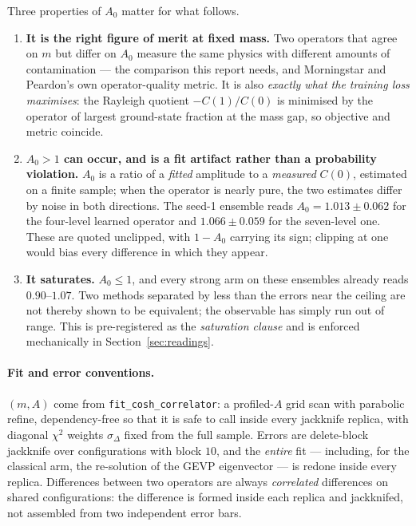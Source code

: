 \documentclass[11pt,a4paper]{article}
\newcommand{\Azero}{A_0}
\begin{document}
Three properties of $\Azero$ matter for what follows.

\begin{enumerate}
  \item \textbf{It is the right figure of merit at fixed mass.} Two operators
        that agree on $m$ but differ on $\Azero$ measure the same physics with
        different amounts of contamination --- the comparison this report needs,
        and Morningstar and Peardon's own operator-quality metric. It is also
        \emph{exactly what the training loss maximises}: the Rayleigh quotient
        $-C(1)/C(0)$ is minimised by the operator of largest ground-state
        fraction at the mass gap, so objective and metric coincide.
  \item \textbf{$\Azero > 1$ can occur, and is a fit artifact rather than a
        probability violation.} $\Azero$ is a ratio of a \emph{fitted} amplitude
        to a \emph{measured} $C(0)$, estimated on a finite sample; when the
        operator is nearly pure, the two estimates differ by noise in both
        directions. The seed-1 ensemble reads $\Azero = 1.013 \pm 0.062$ for the
        four-level learned operator and $1.066 \pm 0.059$ for the seven-level
        one. These are quoted unclipped, with $1-\Azero$ carrying its sign;
        clipping at one would bias every difference in which they appear.
  \item \textbf{It saturates.} $\Azero \le 1$, and every strong arm on these
        ensembles already reads $0.90$--$1.07$. Two methods separated by less
        than the errors near the ceiling are not thereby shown to be equivalent;
        the observable has simply run out of range. This is pre-registered as
        the \emph{saturation clause} and is enforced mechanically in
        Section~\ref{sec:readings}.
\end{enumerate}

\paragraph{Fit and error conventions.} $(m,A)$ come from
\texttt{fit\_cosh\_correlator}: a profiled-$A$ grid scan with parabolic refine,
dependency-free so that it is safe to call inside every jackknife replica, with
diagonal $\chi^2$ weights $\sigma_\Delta$ fixed from the full sample. Errors are
delete-block jackknife over configurations with block $10$, and the
\emph{entire} fit --- including, for the classical arm, the re-solution of the
GEVP eigenvector --- is redone inside every replica. Differences between two
operators are always \emph{correlated} differences on shared configurations:
the difference is formed inside each replica and jackknifed, not assembled from
two independent error bars.
\end{document}
